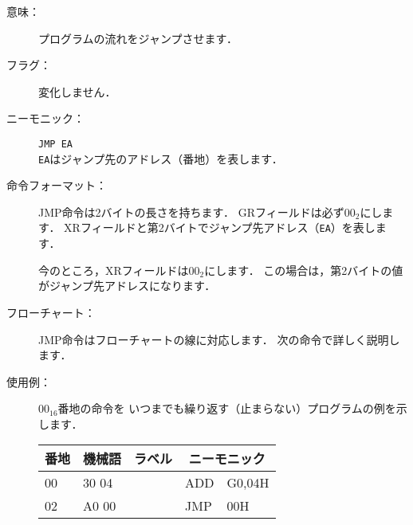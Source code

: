 \begin{description}
\item[意味：]プログラムの流れをジャンプさせます．
\item[フラグ：]変化しません．
\item[ニーモニック：]\texttt{JMP EA} \\
  \texttt{EA}はジャンプ先のアドレス（番地）を表します．

\item[命令フォーマット：]JMP命令は2バイトの長さを持ちます．
  GRフィールドは必ず$00_2$にします．
  XRフィールドと第2バイトでジャンプ先アドレス（\texttt{EA}）を表します．

  今のところ，XRフィールドは$00_2$にします．
  この場合は，第2バイトの値がジャンプ先アドレスになります．


\item[フローチャート：]JMP命令はフローチャートの線に対応します．
  次の命令で詳しく説明します．

\item[使用例：]
  $00_{16}$番地の命令を
  いつまでも繰り返す（止まらない）プログラムの例を示します．

  {\ttfamily\small\begin{center}
    \begin{tabular}{|l|l|l|l l|} \hline
      番地 & 機械語 & ラベル & \multicolumn{2}{|c|}{ニーモニック} \\
      \hline
      00 & 30 04 & & ADD  & G0,04H \\
      02 & A0 00 & & JMP  & 00H    \\
      \hline
    \end{tabular}
  \end{center}}
\end{description}

